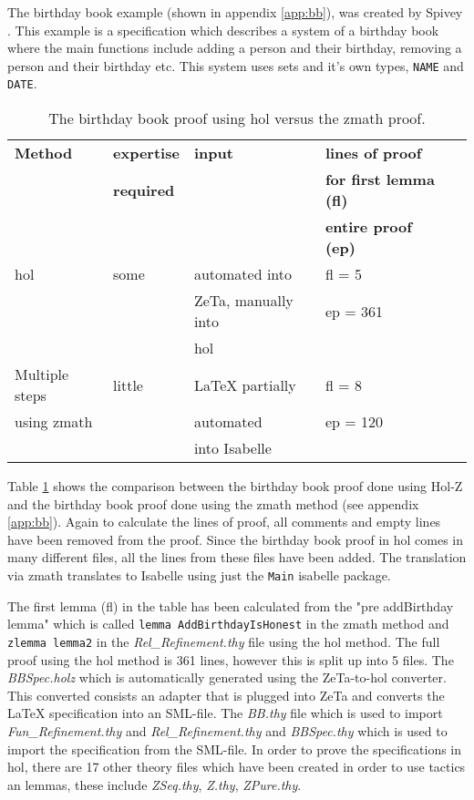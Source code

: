 The birthday book example (shown in appendix \ref{app:bb}), was created by Spivey
\cite{spiveyreferencemanual}. This example is a specification which describes a
system of a birthday book where the main functions include adding a person and
their birthday, removing a person and their birthday etc. This system uses sets
and it's own types, \texttt{NAME} and \texttt{DATE}.

\begin{table}[H]
\begin{center}
\begin{tabular}{| l || l | l | l | l |}
\hline
\textbf{Method} & \textbf{expertise} &  \textbf{input} & \textbf{lines of proof}
\\
& \textbf{required} & & \textbf{for first lemma (fl)}  \\
& & & \textbf{entire proof (ep)} \\
\hline
 \gls{hol} & some  & automated into  & fl = 5  \\
 & & ZeTa, manually into & ep = 361 \\
& & \gls{hol} & \\
\hline
 Multiple steps &  little & \LaTeX{} partially  & fl = 8  \\
using \gls{zmath} & & automated & ep = 120 \\
&  & into Isabelle &  \\
\hline
\end{tabular}
\end{center}
\caption{The birthday book proof using \gls{hol} versus the \gls{zmath} proof.}
\label{tab:comparebb}
\end{table}

Table \ref{tab:comparebb} shows the comparison between the birthday book proof
done using Hol-Z \cite{hol-z} and the birthday book proof done using the
\gls{zmath} method (see appendix \ref{app:bb}). Again to calculate the
lines of proof, all comments and empty lines have been removed from the proof.
Since the birthday book proof in \gls{hol} comes in many different files, all
the lines from these files have been added. The translation via \gls{zmath}
translates to Isabelle using just the \texttt{Main} isabelle package.

The first lemma (fl) in the table has been calculated from the "pre addBirthday
lemma" which is called \texttt{lemma AddBirthdayIsHonest} in the \gls{zmath}
method and \texttt{zlemma lemma2} in the \emph{Rel\_Refinement.thy} file using
the \gls{hol} method. The full proof using the \gls{hol} method is 361 lines,
however this is split up into 5 files. The \emph{BBSpec.holz} which is
automatically generated using the ZeTa-to-\gls{hol} converter. This converted
consists an adapter that is plugged into ZeTa and converts the \LaTeX{}
specification into an SML-file. The \emph{BB.thy} file which is used to import
\emph{Fun\_Refinement.thy} and \emph{Rel\_Refinement.thy} and \emph{BBSpec.thy}
which is used to import the specification from the SML-file. In order to prove
the specifications in \gls{hol}, there are 17 other theory files which have been
created in order to use tactics an lemmas, these include \emph{ZSeq.thy},
\emph{Z.thy}, \emph{ZPure.thy}.

